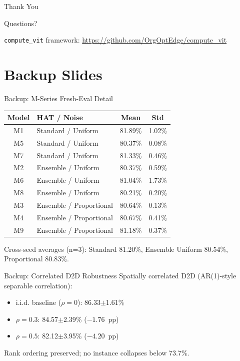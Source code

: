\documentclass[aspectratio=169,11pt]{beamer}
\begin{document}
\begin{frame}
  \centering
  \vspace{2cm}
  {\Huge Thank You}
  \vspace{1cm}
  
  {\large Questions?}
  \vspace{1.5cm}
  
  \texttt{compute\_vit} framework: \url{https://github.com/OrgOptEdge/compute\_vit}
\end{frame}

\appendix
\section{Backup Slides}

\begin{frame}{Backup: M-Series Fresh-Eval Detail}
  \small
  \begin{table}
    \centering
    \begin{tabular}{clcc}
      \toprule
      Model & HAT / Noise & Mean & Std \\
      \midrule
      M1 & Standard / Uniform & 81.89\% & 1.02\% \\
      M5 & Standard / Uniform & 80.37\% & 0.08\% \\
      M7 & Standard / Uniform & 81.33\% & 0.46\% \\
      M2 & Ensemble / Uniform & 80.37\% & 0.59\% \\
      M6 & Ensemble / Uniform & 81.04\% & 1.73\% \\
      M8 & Ensemble / Uniform & 80.21\% & 0.20\% \\
      M3 & Ensemble / Proportional & 80.64\% & 0.13\% \\
      M4 & Ensemble / Proportional & 80.67\% & 0.41\% \\
      M9 & Ensemble / Proportional & 81.18\% & 0.37\% \\
      \bottomrule
    \end{tabular}
  \end{table}
  Cross-seed averages (n=3): Standard 81.20\%, Ensemble Uniform 80.54\%, Proportional 80.83\%.
\end{frame}

\begin{frame}{Backup: Correlated D2D Robustness}
  Spatially correlated D2D (AR(1)-style separable correlation):
  \begin{itemize}
    \item i.i.d. baseline ($\rho = 0$): 86.33$\pm$1.61\%
    \item $\rho = 0.3$: 84.57$\pm$2.39\% ($-1.76$~pp)
    \item $\rho = 0.5$: 82.12$\pm$3.95\% ($-4.20$~pp)
  \end{itemize}
  Rank ordering preserved; no instance collapses below 73.7\%.
\end{frame}
\end{document}
